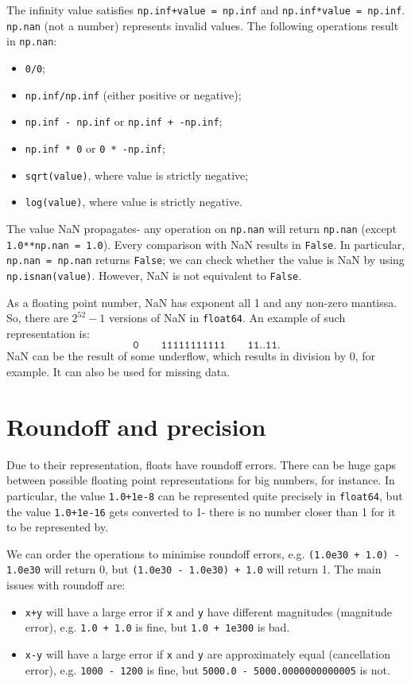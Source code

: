 \documentclass[a4paper, openany]{memoir}
\begin{document}
    The infinity value satisfies \texttt{np.inf+value = np.inf} and \texttt{np.inf*value = np.inf}. \texttt{np.nan} (not a number) represents invalid values. The following operations result in \texttt{np.nan}:
    \begin{itemize}
        \item \texttt{0/0};
        \item \texttt{np.inf/np.inf} (either positive or negative);
        \item \texttt{np.inf - np.inf} or \texttt{np.inf + -np.inf};
        \item \texttt{np.inf * 0} or \texttt{0 * -np.inf};
        \item \texttt{sqrt(value)}, where value is strictly negative;
        \item \texttt{log(value)}, where value is strictly negative.
    \end{itemize}
    The value NaN propagates- any operation on \texttt{np.nan} will return \texttt{np.nan} (except \texttt{1.0**np.nan = 1.0}). Every comparison with NaN results in \texttt{False}. In particular, \texttt{np.nan = np.nan} returns \texttt{False}; we can check whether the value is NaN by using \texttt{np.isnan(value)}. However, NaN is not equivalent to \texttt{False}.

    As a floating point number, NaN has exponent all 1 and any non-zero mantissa. So, there are $2^{52} - 1$ versions of NaN in \texttt{float64}. An example of such representation is:
    \[\texttt{0} \qquad \texttt{11111111111} \qquad \texttt{11..11}.\]        
    NaN can be the result of some underflow, which results in division by 0, for example. It can also be used for missing data.
    \newpage

    \section{Roundoff and precision}
    Due to their representation, floats have roundoff errors. There can be huge gaps between possible floating point representations for big numbers, for instance. In particular, the value \texttt{1.0+1e-8} can be represented quite precisely in \texttt{float64}, but the value \texttt{1.0+1e-16} gets converted to 1- there is no number closer than 1 for it to be represented by.

    We can order the operations to minimise roundoff errors, e.g. \texttt{(1.0e30 + 1.0) - 1.0e30} will return 0, but \texttt{(1.0e30 - 1.0e30) + 1.0} will return 1. The main issues with roundoff are:
    \begin{itemize}
        \item \texttt{x+y} will have a large error if \texttt{x} and \texttt{y} have different magnitudes (magnitude error), e.g. \texttt{1.0 + 1.0} is fine, but \texttt{1.0 + 1e300} is bad.
        \item \texttt{x-y} will have a large error if \texttt{x} and \texttt{y} are approximately equal (cancellation error), e.g. \texttt{1000 - 1200} is fine, but \texttt{5000.0 - 5000.0000000000005} is not.
    \end{itemize}
\end{document}

